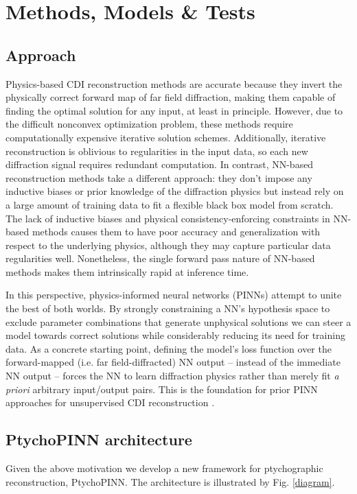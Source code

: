 \documentclass[sn-mathphys]{sn-jnl}%
\theoremstyle{thmstyleone}%
\theoremstyle{thmstyletwo}%
\theoremstyle{thmstylethree}%
\begin{document}
\section{Methods, Models \& Tests}
\subsection{Approach}

Physics-based CDI reconstruction methods are accurate because they invert the physically correct forward map of far field diffraction, making them capable of finding the optimal solution for any input, at least in principle. However, due to the difficult nonconvex optimization problem, these methods require computationally expensive iterative solution schemes. Additionally, iterative reconstruction is oblivious to regularities in the input data, so each new diffraction signal requires redundant computation. In contrast, NN-based reconstruction methods take a different approach: they don't impose any inductive biases or prior knowledge of the diffraction physics but instead rely on a large amount of training data to fit a flexible black box model from scratch. The lack of inductive biases and physical consistency-enforcing constraints in NN-based methods causes them to have poor accuracy and generalization with respect to the underlying physics, although they may capture particular data regularities well. Nonetheless, the single forward pass nature of NN-based methods makes them intrinsically rapid at inference time.

In this perspective, physics-informed neural networks (PINNs) attempt to unite the best of both worlds. By strongly constraining a NN's hypothesis space to exclude parameter combinations that generate unphysical solutions we can steer a model towards correct solutions while considerably reducing its need for training data. As a concrete starting point, defining the model's loss function over the forward-mapped (i.e. far field-diffracted) NN output -- instead of the immediate NN output -- forces the NN to learn diffraction physics rather than merely fit \emph{a priori} arbitrary input/output pairs. This is the foundation for prior PINN approaches for unsupervised CDI reconstruction \cite{yao2022autophasenn, ratner2021recovering}.

\subsection{PtychoPINN architecture}
Given the above motivation we develop a new framework for ptychographic reconstruction, PtychoPINN. The architecture is illustrated by Fig. \ref{diagram}.
\end{document}
